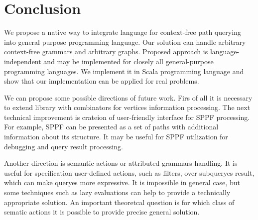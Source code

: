 \section{Conclusion}

We propose a native way to integrate language for context-free path querying into general purpose programming language.
Our solution can handle arbitrary context-free grammars and arbitrary graphs.
Proposed approach is language-independent and may be implemented for closely all general-purpose programming languages.
We implement it in Scala programming language and show that our implementation can be applied for real problems.

We can propose some possible directions of future work.
Firs of all it is necessary to extend library with combinators for vertices information processing.
The next technical improvement is crateion of user-friendly interface for SPPF processing.
For example, SPPF can be presented as a set of paths with additional information about its structure.
It may be useful for SPPF utilization for debugging and query result processing.

Another direction is semantic actions or attributed grammars handling.
It is useful for specification user-defined actions, such as filters, over subqueryes result, which can make queryes more expressive.
It is impossible in general case, but some techniques such as lazy evaluations can help to provide a technically appropriate solution.
An important theoretcal question is for which class of sematic actions it is possible to provide precise general solution.


